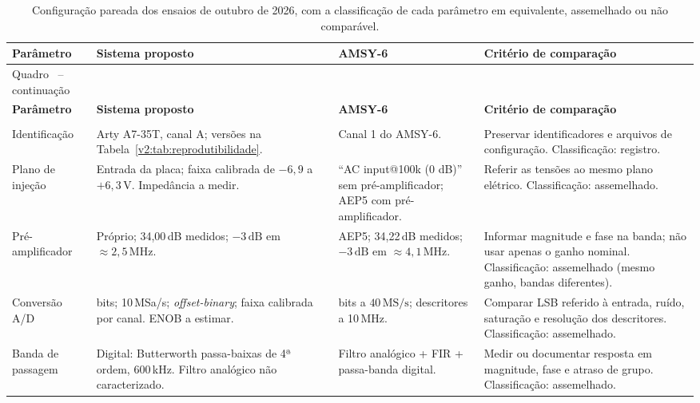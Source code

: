 \begingroup
\renewcommand{\tablename}{Quadro}
\scriptsize
\renewcommand{\arraystretch}{1.22}
\begin{longtable}{|
		>{\raggedright\arraybackslash}p{3.0cm}|
		>{\raggedright\arraybackslash}p{3.7cm}|
		>{\raggedright\arraybackslash}p{3.7cm}|
		>{\raggedright\arraybackslash}p{3.8cm}|}
	\caption{Configuração pareada dos ensaios de outubro de 2026, com a classificação de cada parâmetro em equivalente, assemelhado ou não comparável.}
	\label{v2:qua:configuracao_pareada_secao5}\\
	\hline
	\textbf{Parâmetro} & \textbf{Sistema proposto} & \textbf{AMSY-6} & \textbf{Critério de comparação} \\
	\hline
	\endfirsthead
	\multicolumn{4}{c}
	{\tablename\ \thetable{} -- continuação}\\
	\hline
	\textbf{Parâmetro} & \textbf{Sistema proposto} & \textbf{AMSY-6} & \textbf{Critério de comparação} \\
	\hline
	\endhead
	\hline
	\multicolumn{4}{r}{Continua na próxima página.}\\
	\endfoot
	\hline
	\endlastfoot
	Identificação & Arty A7-35T, canal A; versões na Tabela~\ref{v2:tab:reprodutibilidade}. & Canal 1 do AMSY-6. & Preservar identificadores e arquivos de configuração. Classificação: registro. \\
	\hline
	Plano de injeção & Entrada da placa; faixa calibrada de \(-6{,}9\) a \(+6{,}3\,\mathrm{V}\). Impedância a medir. & ``AC input@100k (0 dB)'' sem pré-amplificador; AEP5 com pré-amplificador. & Referir as tensões ao mesmo plano elétrico. Classificação: assemelhado. \\
	\hline
	Pré-amplificador & Próprio; 34,00\,dB medidos; \(-3\,\mathrm{dB}\) em \(\approx 2{,}5\,\mathrm{MHz}\). & AEP5; 34,22\,dB medidos; \(-3\,\mathrm{dB}\) em \(\approx 4{,}1\,\mathrm{MHz}\). & Informar magnitude e fase na banda; não usar apenas o ganho nominal. Classificação: assemelhado (mesmo ganho, bandas diferentes). \\
	\hline
	Conversão A/D & 12 bits; 10\,MSa/s; \textit{offset-binary}; faixa calibrada por canal. ENOB a estimar. & 16 bits a \(40\,\mathrm{MS/s}\); descritores a 10\,MHz. & Comparar LSB referido à entrada, ruído, saturação e resolução dos descritores. Classificação: assemelhado. \\
	\hline
	Banda de passagem & Digital: Butterworth passa-baixas de 4ª ordem, 600\,kHz. Filtro analógico não caracterizado. & Filtro analógico + FIR + passa-banda digital.  & Medir ou documentar resposta em magnitude, fase e atraso de grupo. Classificação: assemelhado. \\

\end{longtable}
